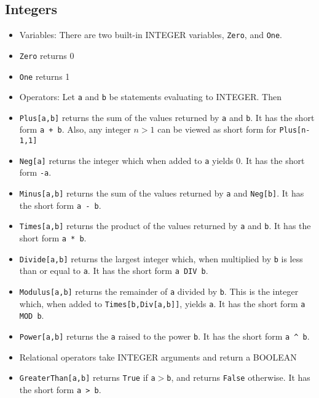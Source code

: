 \subsection{Integers}
\begin{itemize}
\item
Variables:  
There are two built-in INTEGER variables, \verb+Zero+, and \verb+One+.

\bd
\item
\verb+Zero+ returns 0

\item
\verb+One+ returns 1
\ed

\item
Operators:
Let \verb+a+ and \verb+b+ be statements evaluating to INTEGER. Then

\bd
\item
\verb+Plus[a,b]+ returns the sum of the values returned by
\verb+a+ and \verb+b+.  It has the short form \verb&a + b&.  Also,
any integer $n>1$ can be viewed as short form for \verb+Plus[n-1,1]+  
 
\item
\verb+Neg[a]+ returns the integer which when added to \verb+a+ yields
0.  It has the short form \verb&-a&.  
 
\item
\verb+Minus[a,b]+ returns the sum of the values returned by
\verb+a+ and \verb+Neg[b]+.  It has the short form \verb&a - b&.  

\item
\verb+Times[a,b]+ returns the product of the values returned by
\verb+a+ and \verb+b+.  It has the short form \verb+a * b+.

\item
\verb+Divide[a,b]+ returns the largest integer which, when
multiplied by \verb+b+ is less than or equal to \verb+a+.  It has the
short form \verb+a DIV b+.

\item
\verb+Modulus[a,b]+ returns the remainder of \verb+a+ divided by
\verb+b+.  This is the integer which, when added to
\verb+Times[b,Div[a,b]]+, yields \verb+a+.  It has the short form 
\verb+a MOD b+.
\item
\verb+Power[a,b]+ returns the \verb+a+ raised to the power \verb+b+.  
It has the short form \verb+a ^ b+.

\ed
\item
Relational operators take INTEGER arguments and
return a BOOLEAN
\bd
\item
\verb+GreaterThan[a,b]+ returns \verb+True+ if \verb+a+$>$\verb+b+, and
returns \verb+False+ otherwise.  It has the short form \verb+a > b+.


\end{itemize}

